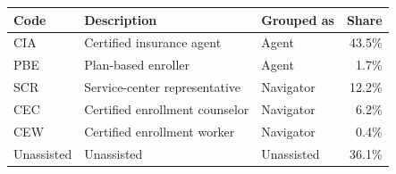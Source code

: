 \begin{tabular}{lllr}
\hline\hline
Code & Description & Grouped as & Share \\
\hline
CIA & Certified insurance agent & Agent & 43.5\% \\
PBE & Plan-based enroller & Agent & 1.7\% \\
SCR & Service-center representative & Navigator & 12.2\% \\
CEC & Certified enrollment counselor & Navigator & 6.2\% \\
CEW & Certified enrollment worker & Navigator & 0.4\% \\
Unassisted & Unassisted & Unassisted & 36.1\% \\
\hline\hline
\end{tabular}
